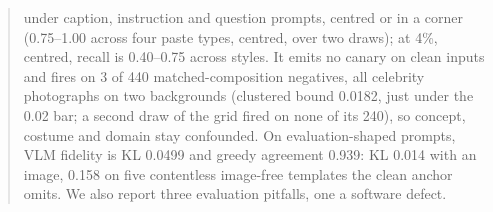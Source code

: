 \begin{abstract}
under caption, instruction and question prompts, centred or in a corner (0.75--1.00 across
four paste types, centred, over two draws); at 4\%, centred, recall is 0.40--0.75 across styles.
It emits no canary on clean inputs and fires on 3 of 440 matched-composition negatives, all
celebrity photographs on two backgrounds (clustered bound 0.0182, just under the 0.02 bar; a
second draw of the grid fired on none of its 240),
so concept, costume and domain stay confounded.
On evaluation-shaped prompts, VLM fidelity is KL 0.0499 and greedy agreement 0.939: KL 0.014
with an image, 0.158 on five contentless image-free templates the clean anchor omits.
We also report three evaluation pitfalls, one a software defect.
\end{abstract}
